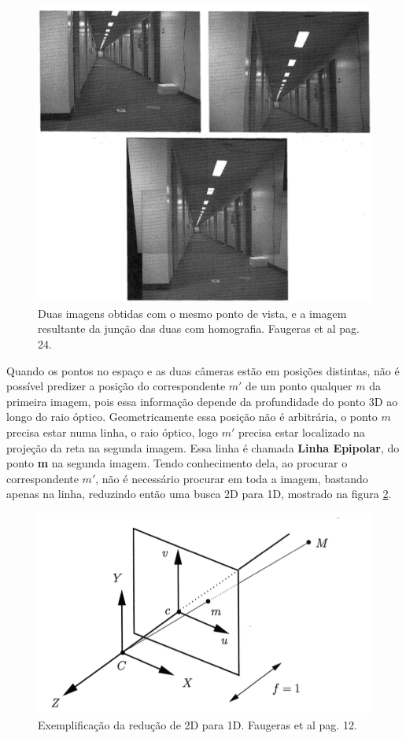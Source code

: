 \begin{figure}
	\centering
		\includegraphics[width=1.0\textwidth]{Imagens/figura2-2.png}
	\caption{Duas imagens obtidas com o mesmo ponto de vista, e a imagem resultante da junção das duas com homografia. Faugeras et al \cite{Faugeras-Geometry} pag. 24.}
	\label{fig2}
\end{figure}

Quando os pontos no espaço e as duas câmeras estão em posições distintas, não é possível predizer a posição do correspondente $m'$ de um ponto qualquer $m$ da primeira imagem, pois essa informação depende da profundidade do ponto 3D ao longo do raio óptico. Geometricamente essa posição não é arbitrária, o ponto $m$ precisa estar numa linha, o raio óptico, logo $m'$ precisa estar localizado na projeção da reta na segunda imagem. Essa linha é chamada \textbf{Linha Epipolar}, do ponto \textbf{m} na segunda imagem. Tendo conhecimento dela, ao procurar o correspondente $m'$, não é necessário procurar em toda a imagem, bastando apenas na linha, reduzindo então uma busca 2D para 1D, mostrado na figura \ref{fig3}.

\begin{figure}
	\centering
		\includegraphics{Imagens/figura2-3.png}
	\caption{Exemplificação da redução de 2D para 1D. Faugeras et al \cite{Faugeras-Geometry} pag. 12.}
	\label{fig3}
\end{figure}


